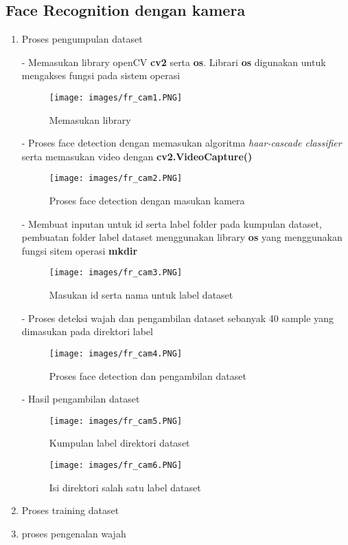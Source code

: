 \subsection{Face Recognition dengan kamera}
\begin{enumerate}
    \item Proses pengumpulan dataset
    
    - Memasukan library openCV \textbf{cv2} serta \textbf{os}. Librari \textbf{os}
    digunakan untuk mengakses fungsi pada sistem operasi
    \begin{figure}[h!]
        \centering
        \texttt{[image: images/fr\_cam1.PNG]}
        \caption{Memasukan library }
    \end{figure}

    - Proses face detection dengan memasukan algoritma \emph{haar-cascade classifier} serta
     memasukan video dengan \textbf{cv2.VideoCapture()}
     \begin{figure}[h!]
        \centering
        \texttt{[image: images/fr\_cam2.PNG]}
        \caption{Proses face detection dengan masukan kamera}
    \end{figure}

    - Membuat inputan untuk id serta label folder pada kumpulan dataset, pembuatan folder label dataset menggunakan 
    library \textbf{os} yang menggunakan fungsi sitem operasi \textbf{mkdir}
    \begin{figure}[h!]
        \centering
        \texttt{[image: images/fr\_cam3.PNG]}
        \caption{Masukan id serta nama untuk label dataset}
    \end{figure}

    - Proses deteksi wajah dan pengambilan dataset sebanyak 40 sample yang dimasukan pada direktori label
    \begin{figure}[h!]
        \centering
        \texttt{[image: images/fr\_cam4.PNG]}
        \caption{Proses face detection dan pengambilan dataset}
    \end{figure}

    - Hasil pengambilan dataset
    \begin{figure}[h!]
        \centering
        \texttt{[image: images/fr\_cam5.PNG]}
        \caption{Kumpulan label direktori dataset}
        \texttt{[image: images/fr\_cam6.PNG]}
        \caption{Isi direktori salah satu label dataset}
    \end{figure}
    \item Proses training dataset
    \item proses pengenalan wajah
\end{enumerate}